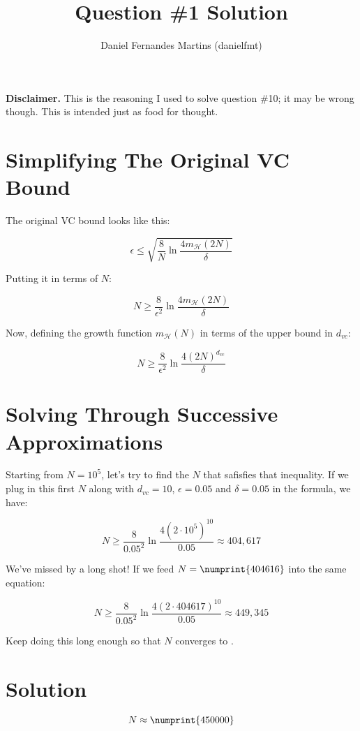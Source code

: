 \documentclass{article}
\author{Daniel Fernandes Martins (danielfmt)}
\title{Question \#1 Solution}
\begin{document}
\maketitle

\textbf{Disclaimer.} This is the reasoning I used to solve question \#10; it
may be wrong though. This is intended just as food for thought.

\section{Simplifying The Original VC Bound}

The original VC bound looks like this:

\begin{equation*}
\epsilon \leq \sqrt{\frac{8}{N}\ln{\frac{4m_{\mathcal{H}}(2N)}{\delta}}}
\end{equation*}

Putting it in terms of $N$:

\begin{equation*}
N \geq \frac{8}{\epsilon^2}\ln{\frac{4m_{\mathcal{H}}(2N)}{\delta}}
\end{equation*}

Now, defining the growth function $m_{\mathcal{H}}(N)$ in terms of the upper
bound in $d_{vc}$:

\begin{equation*}
N \geq \frac{8}{\epsilon^2}\ln{\frac{4(2N)^{d_{vc}}}{\delta}}
\end{equation*}

\section{Solving Through Successive Approximations}

Starting from $N=10^5$, let's try to find the $N$ that safisfies that
inequality. If we plug in this first $N$ along with $d_{vc}=10$,
$\epsilon=0.05$ and $\delta=0.05$ in the formula, we have:

\begin{equation*}
N \geq \frac{8}{0.05^2}\ln{\frac{4(2\cdot10^5)^{10}}{0.05}} \approx 404,617
\end{equation*}

We've missed by a long shot! If we feed $N=\numprint{404616}$ into the same
equation:

\begin{equation*}
N \geq \frac{8}{0.05^2}\ln{\frac{4(2\cdot404617)^{10}}{0.05}} \approx 449,345
\end{equation*}

Keep doing this long enough so that $N$ converges to .

\section{Solution}

\begin{equation*}
N\approx\numprint{450000}
\end{equation*}
\end{document}
